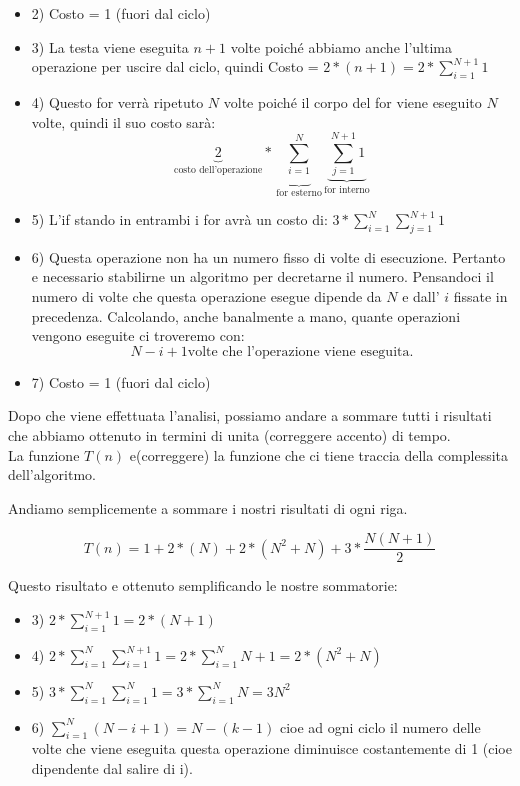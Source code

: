 \begin{itemize}
\item 2) Costo = 1 (fuori dal ciclo)
\item 3) La testa viene eseguita $n+1$ volte poiché abbiamo anche l'ultima operazione per uscire dal ciclo, quindi Costo = $2*(n+1) = 2 * \sum_{i=1}^{N+1} 1$
\item 4) Questo for verrà ripetuto $N$ volte poiché il corpo del for viene eseguito $N$ volte, quindi il suo costo sarà:
$$ \underbrace{2}_{\text{costo dell'operazione}}*\underbrace{\sum_{i=1}^{N}}_{\text{for esterno}} \underbrace{\sum_{j=1}^{N+1} 1}_{\text{for interno}}$$
\item 5) L'if stando in entrambi i for avrà un costo di: $3*\sum_{i=1}^{N} \sum_{j=1}^{N+1} 1$
\item 6) Questa operazione non ha un numero fisso di volte di esecuzione. Pertanto e necessario stabilirne un algoritmo per decretarne il numero. Pensandoci il numero di volte che questa operazione esegue dipende da $N$ e dall' $i$ fissate in precedenza. Calcolando, anche banalmente a mano, quante operazioni vengono eseguite ci troveremo con:
$$N-i+1 \text{volte che l'operazione viene eseguita.}$$ 
\item 7) Costo = 1 (fuori dal ciclo)
\end{itemize}

Dopo che viene effettuata l'analisi, possiamo andare a sommare tutti i risultati che abbiamo ottenuto in termini di unita (correggere accento) di tempo.\\
La funzione $T(n)$ e(correggere) la funzione che ci tiene traccia della complessita dell'algoritmo.

Andiamo semplicemente a sommare i nostri risultati di ogni riga.

$$T(n)=1 + 2*(N) + 2*(N^2+N) + 3*\frac{N(N+1)}{2}$$

Questo risultato e ottenuto semplificando le nostre sommatorie:
\begin{itemize}
\item 3) $2*\sum_{i=1}^{N+1} 1 = 2*(N+1)$
\item 4) $2*\sum_{i=1}^{N}\sum_{i=1}^{N+1} 1 = 2*\sum_{i=1}^{N}N+1 = 2*(N^2+N)$
\item 5) $3*\sum_{i=1}^{N}\sum_{i=1}^{N}1 = 3*\sum_{i=1}^{N} N = 3N^2$
\item 6) $\sum_{i=1}^{N}(N-i+1) = N-(k-1)$ cioe ad ogni ciclo il numero delle volte che viene eseguita questa operazione diminuisce costantemente di 1 (cioe dipendente dal salire di i).
\end{itemize}

